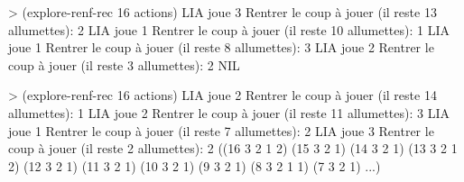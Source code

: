 \documentclass[
]{article}
\newenvironment{Shaded}{}{}
\newcommand{\DecValTok}[1]{\textcolor[rgb]{0.25,0.63,0.44}{#1}}
\newcommand{\NormalTok}[1]{#1}
\newcommand{\OperatorTok}[1]{\textcolor[rgb]{0.40,0.40,0.40}{#1}}
\begin{document}
\begin{Shaded}
    \begin{algorithm}[H]
\begin{Highlighting}[]
\OperatorTok{\textgreater{}}\NormalTok{ (explore{-}renf{-}rec }\DecValTok{16}\NormalTok{ actions)}
\NormalTok{L\textquotesingle{}IA joue }\DecValTok{3} 
\NormalTok{Rentrer le coup à jouer (il reste }\DecValTok{13}\NormalTok{ allumettes): }
\DecValTok{2}
\NormalTok{L\textquotesingle{}IA joue }\DecValTok{1} 
\NormalTok{Rentrer le coup à jouer (il reste }\DecValTok{10}\NormalTok{ allumettes): }
\DecValTok{1}
\NormalTok{L\textquotesingle{}IA joue }\DecValTok{1} 
\NormalTok{Rentrer le coup à jouer (il reste }\DecValTok{8}\NormalTok{ allumettes): }
\DecValTok{3}
\NormalTok{L\textquotesingle{}IA joue }\DecValTok{2} 
\NormalTok{Rentrer le coup à jouer (il reste }\DecValTok{3}\NormalTok{ allumettes): }
\DecValTok{2}
\NormalTok{NIL}
\end{Highlighting}
\end{algorithm}
\end{Shaded}

\begin{Shaded}
    \begin{algorithm}[H]
\begin{Highlighting}[]
\OperatorTok{\textgreater{}}\NormalTok{ (explore{-}renf{-}rec }\DecValTok{16}\NormalTok{ actions)}
\NormalTok{L\textquotesingle{}IA joue }\DecValTok{2} 
\NormalTok{Rentrer le coup à jouer (il reste }\DecValTok{14}\NormalTok{ allumettes): }
\DecValTok{1}
\NormalTok{L\textquotesingle{}IA joue }\DecValTok{2} 
\NormalTok{Rentrer le coup à jouer (il reste }\DecValTok{11}\NormalTok{ allumettes): }
\DecValTok{3}
\NormalTok{L\textquotesingle{}IA joue }\DecValTok{1} 
\NormalTok{Rentrer le coup à jouer (il reste }\DecValTok{7}\NormalTok{ allumettes): }
\DecValTok{2}
\NormalTok{L\textquotesingle{}IA joue }\DecValTok{3} 
\NormalTok{Rentrer le coup à jouer (il reste }\DecValTok{2}\NormalTok{ allumettes): }
\DecValTok{2}
\NormalTok{((}\DecValTok{16} \DecValTok{3} \DecValTok{2} \DecValTok{1} \DecValTok{2}\NormalTok{) (}\DecValTok{15} \DecValTok{3} \DecValTok{2} \DecValTok{1}\NormalTok{) (}\DecValTok{14} \DecValTok{3} \DecValTok{2} \DecValTok{1}\NormalTok{) (}\DecValTok{13} \DecValTok{3} \DecValTok{2} \DecValTok{1} \DecValTok{2}\NormalTok{)}
\NormalTok{ (}\DecValTok{12} \DecValTok{3} \DecValTok{2} \DecValTok{1}\NormalTok{) (}\DecValTok{11} \DecValTok{3} \DecValTok{2} \DecValTok{1}\NormalTok{) (}\DecValTok{10} \DecValTok{3} \DecValTok{2} \DecValTok{1}\NormalTok{) (}\DecValTok{9} \DecValTok{3} \DecValTok{2} \DecValTok{1}\NormalTok{) (}\DecValTok{8} \DecValTok{3} \DecValTok{2} \DecValTok{1} \DecValTok{1}\NormalTok{)}
\NormalTok{ (}\DecValTok{7} \DecValTok{3} \DecValTok{2} \DecValTok{1}\NormalTok{) ...)}
\end{Highlighting}
\end{algorithm}
\end{Shaded}
\end{document}
